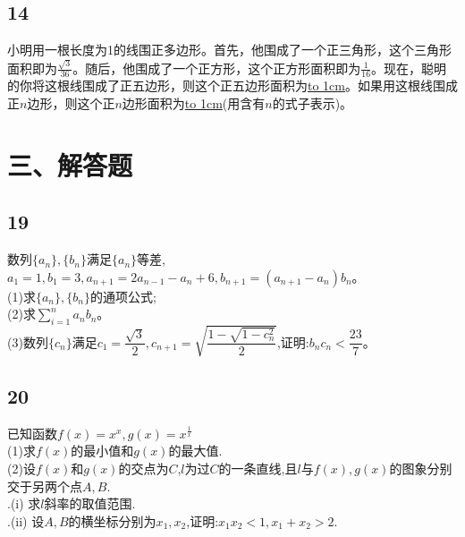 \documentclass[fontset=windows]{article}
\begin{document}
\subsection{14}
小明用一根长度为1的线围正多边形。首先，他围成了一个正三角形，这个三角形面积即为$\frac{\sqrt{3}}{36}$。随后，他围成了一个正方形，这个正方形面积即为$\frac{1}{16}$。现在，聪明的你将这根线围成了正五边形，则这个正五边形面积为\underline{\hbox to 1cm{}}。如果用这根线围成正$n$边形，则这个正$n$边形面积为\underline{\hbox to 1cm{}}(用含有$n$的式子表示)。


\section{三、解答题}
\subsection{19}
数列$\{a_n\},\{b_n\}$满足$\{a_n\}$等差,$a_1=1,b_1=3,a_{n+1}=2a_{n-1}-a_n+6,b_{n+1}=(a_{n+1}-a_n)b_n$。\\
(1)求$\{a_n\},\{b_n\}$的通项公式;\\
(2)求$\displaystyle\sum\limits_{i=1}^{n}a_nb_n$。\\
(3)数列$\{c_n\}$满足$c_1=\dfrac{\sqrt3}2,
c_{n+1}=\sqrt{\dfrac{1-\sqrt{1-c_n^2}}{2}}$,证明:$b_nc_n<\dfrac{23}{7}$。
\subsection{20}
已知函数$f(x)=x^x,g(x)=x^\frac{1}{x}$\\
(1)求$f(x)$的最小值和$g(x)$的最大值.\\
(2)设$f(x)$和$g(x)$的交点为$C$,$l$为过$C$的一条直线,且$l$与$f(x),g(x)$的图象分别交于另两个点$A,B.$\\
.\hspace{2em}(i) 求$l$斜率的取值范围.\\
.\hspace{2em}(ii) 设$A,B$的横坐标分别为$x_1,x_2$,证明:$x_1x_2<1,x_1+x_2>2.$\\
\end{document}
